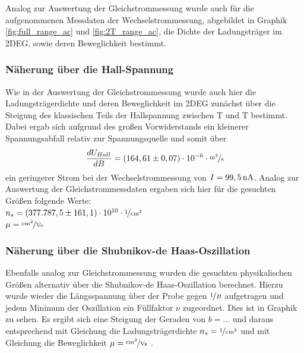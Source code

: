 

Analog zur Auswertung der Gleichstrommessung wurde auch für die aufgenommenen Messdaten der Wechselstrommessung, abgebildet in Graphik \ref{fig:full_range_ac} und \ref{fig:2T_range_ac}, die Dichte der Ladungsträger im 2DEG, sowie deren Beweglichkeit bestimmt.

\subsubsection{Näherung über die Hall-Spannung}
\label{ch:naeherung_hall2}

Wie in der Auswertung der Gleichstrommessung wurde auch hier die Ladungsträgerdichte und deren Beweglichkeit im 2DEG zunächst über die Steigung des klassischen Teils der Hallspannung zwischen \unit[-2]{T} und \unit[2]{T} bestimmt. Dabei ergab sich aufgrund des großen Vorwiderstands ein kleinerer Spannungsabfall relativ zur Spannungsquelle und somit über
\begin{equation}
	\d{U_{Hall}}{B} = ( 164,61 \pm 0,07 ) \cdot 10^{-6} \cdot \unitfrac{m^2}{s}
\end{equation}
ein geringerer Strom bei der Wechselstrommessung von $I=\unit[99,5]{nA}$. Analog zur Auswertung der Gleichstrommessdaten ergaben sich hier für die gesuchten Größen folgende Werte: \\
$n_s=  ( 377.787,5 \pm 161,1) \cdot 10^{10} \cdot \unitfrac{1}{cm^2}$\\
$\mu= \unitfrac{cm^2}{Vs}$  %


\subsubsection{Näherung über die Shubnikov-de Haas-Oszillation}
\label{ch:naeherung_ac}

Ebenfalls analog zur Gleichstrommessung wurden die gesuchten physikalischen Größen alternativ über die Shubnikov-de Haas-Oszillation berechnet. Hierzu wurde wieder die Längsspannung über der Probe 
gegen $\nicefrac{1}{B}$ aufgetragen und jedem Minimum der Oszillation ein Füllfaktor $\nu$ zugeordnet. Dies ist in Graphik %
zu sehen. 
Es ergibt sich eine Steigung der Geraden von $b=...$  %
und daraus entsprechend mit Gleichung %
die Ladungsträgerdichte $n_s= \unitfrac{1}{cm^2}$  %
und mit Gleichung %
die Beweglichkeit          
$\mu= \unitfrac{cm^2}{Vs}$ . %




